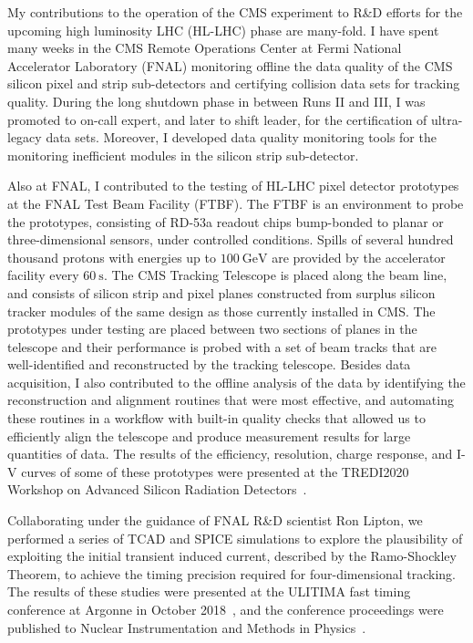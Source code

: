 My contributions to the operation of the CMS experiment to R\&D efforts for the upcoming high luminosity LHC (HL-LHC) phase are many-fold.
I have spent many weeks in the CMS Remote Operations Center at Fermi National Accelerator Laboratory (FNAL) monitoring offline the data quality of the CMS silicon pixel and strip sub-detectors and certifying collision data sets for tracking quality.
During the long shutdown phase in between Runs II and III, I was promoted to on-call expert, and later to shift leader, for the certification of ultra-legacy data sets.
Moreover, I developed data quality monitoring tools for the monitoring inefficient modules in the silicon strip sub-detector.

Also at FNAL, I contributed to the testing of HL-LHC pixel detector prototypes at the FNAL Test Beam Facility (FTBF).
The FTBF is an environment to probe the prototypes, consisting of RD-53a readout chips bump-bonded to planar or three-dimensional sensors, under controlled conditions.
Spills of several hundred thousand protons with energies up to $\SI{100}{\GeV}$ are provided by the accelerator facility every $\SI{60}{\s}$.
The CMS Tracking Telescope is placed along the beam line, and consists of silicon strip and pixel planes constructed from surplus silicon tracker modules of the same design as those currently installed in CMS.
The prototypes under testing are placed between two sections of planes in the telescope and their performance is probed with a set of beam tracks that are well-identified and reconstructed by the tracking telescope.
Besides data acquisition, I also contributed to the offline analysis of the data by identifying the reconstruction and alignment routines that were most effective, and automating these routines in a workflow with built-in quality checks that allowed us to efficiently align the telescope and produce measurement results for large quantities of data.
The results of the efficiency, resolution, charge response, and I-V curves of some of these prototypes were presented at the TREDI2020 Workshop on Advanced Silicon Radiation Detectors~\cite{TREDI2020}.

Collaborating under the guidance of FNAL R\&D scientist Ron Lipton, we performed a series of TCAD and SPICE simulations to explore the plausibility of exploiting the initial transient induced current, described by the Ramo-Shockley Theorem, to achieve the timing precision required for four-dimensional tracking.
The results of these studies were presented at the ULITIMA fast timing conference at Argonne in October 2018~\cite{ULITIMA2018}, and the conference proceedings were published to Nuclear Instrumentation and Methods in Physics~\cite{LIPTON2019162423}.

